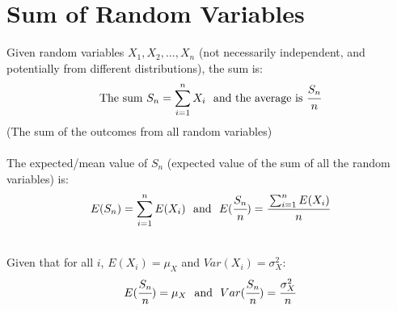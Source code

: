 \section{Sum of Random Variables}
Given random variables $X_1, X_2, \dots, X_n$ (not necessarily independent, and potentially from different distributions), the sum is:
\[\text{The sum }S_n = \sum_{i=1}^nX_i \ \text{ and the average is } \cfrac{S_n}{n}\]
(The sum of the outcomes from all random variables)
\\
\\ The expected/mean value of $S_n$ (expected value of the sum of all the random variables) is:
\[E(S_n) = \sum_{i=1}^nE(X_i) \ \text{ and } \ E(\cfrac{S_n}{n}) = \cfrac{\sum_{i=1}^nE(X_i)}{n}\]
\begin{itemize}
	\\ Given that for all $i$, $E(X_i) = \mu_X$ and $Var(X_i) = \sigma^2_X$:
	\[E(\cfrac{S_n}{n}) = \mu_X \ \text{ and } \ Var(\cfrac{S_n}{n}) = \cfrac{\sigma_X^2}{n}\]
\end{itemize}

